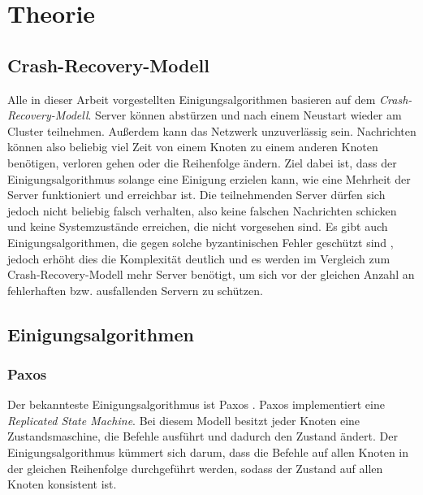 \chapter{Theorie}
\label{theory}


\section{Crash-Recovery-Modell}

Alle in dieser Arbeit vorgestellten Einigungsalgorithmen basieren auf dem \textit{Crash-Recovery-Modell}. Server können abstürzen und nach einem Neustart wieder am Cluster teilnehmen. Außerdem kann das Netzwerk unzuverlässig sein. Nachrichten können also beliebig viel Zeit von einem Knoten zu einem anderen Knoten benötigen, verloren gehen oder die Reihenfolge ändern. Ziel dabei ist, dass der Einigungsalgorithmus solange eine Einigung erzielen kann, wie eine Mehrheit der Server funktioniert und erreichbar ist. Die teilnehmenden Server dürfen sich jedoch nicht beliebig falsch verhalten, also keine falschen Nachrichten schicken und keine Systemzustände erreichen, die nicht vorgesehen sind. Es gibt auch Einigungsalgorithmen, die gegen solche byzantinischen Fehler geschützt sind \cite{byzantine-paxos}, jedoch erhöht dies die Komplexität deutlich und es werden im Vergleich zum Crash-Recovery-Modell mehr Server benötigt, um sich vor der gleichen Anzahl an fehlerhaften bzw. ausfallenden Servern zu schützen.

\section{Einigungsalgorithmen}

\subsection{Paxos}

Der bekannteste Einigungsalgorithmus ist Paxos \cite{paxos, simple-paxos}. Paxos implementiert eine \textit{Replicated State Machine}.  Bei diesem Modell besitzt jeder Knoten eine Zustandsmaschine, die Befehle ausführt und dadurch den Zustand ändert. Der Einigungsalgorithmus kümmert sich darum, dass die Befehle auf allen Knoten in der gleichen Reihenfolge durchgeführt werden, sodass der Zustand auf allen Knoten konsistent ist.

